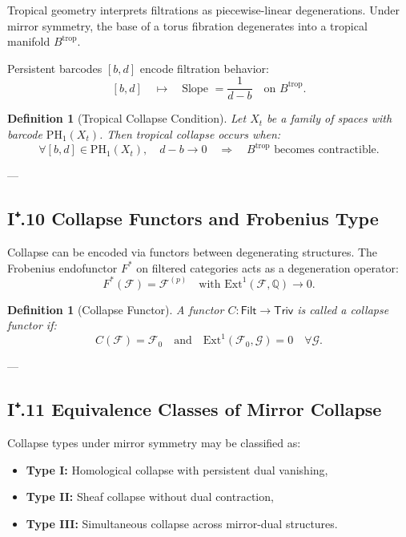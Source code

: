 \documentclass[11pt]{article}
\newtheorem{definition}[theorem]{Definition}
\begin{document}
Tropical geometry interprets filtrations as piecewise-linear degenerations.  
Under mirror symmetry, the base of a torus fibration degenerates into a tropical manifold $B^{\mathrm{trop}}$.

Persistent barcodes $[b,d]$ encode filtration behavior:
\[
[b,d] \quad \mapsto \quad \text{Slope } = \frac{1}{d - b} \quad \text{on } B^{\mathrm{trop}}.
\]

\begin{definition}[Tropical Collapse Condition]
Let $X_t$ be a family of spaces with barcode $\mathrm{PH}_1(X_t)$.  
Then tropical collapse occurs when:
\[
\forall [b,d] \in \mathrm{PH}_1(X_t), \quad d - b \to 0 \quad \Rightarrow \quad B^{\mathrm{trop}} \text{ becomes contractible.}
\]
\end{definition}

---

\subsection*{I⁺.10 Collapse Functors and Frobenius Type}

Collapse can be encoded via functors between degenerating structures.  
The Frobenius endofunctor $F^*$ on filtered categories acts as a degeneration operator:
\[
F^*(\mathcal{F}) = \mathcal{F}^{(p)} \quad \text{with } \mathrm{Ext}^1(\mathcal{F}, \mathbb{Q}) \to 0.
\]

\begin{definition}[Collapse Functor]
A functor $C: \mathsf{Filt} \to \mathsf{Triv}$ is called a collapse functor if:
\[
C(\mathcal{F}) = \mathcal{F}_0 \quad \text{and} \quad \mathrm{Ext}^1(\mathcal{F}_0, \mathcal{G}) = 0 \quad \forall \mathcal{G}.
\]
\end{definition}

---

\subsection*{I⁺.11 Equivalence Classes of Mirror Collapse}

Collapse types under mirror symmetry may be classified as:

\begin{itemize}
  \item \textbf{Type I:} Homological collapse with persistent dual vanishing,
  \item \textbf{Type II:} Sheaf collapse without dual contraction,
  \item \textbf{Type III:} Simultaneous collapse across mirror-dual structures.
\end{itemize}
\end{document}
